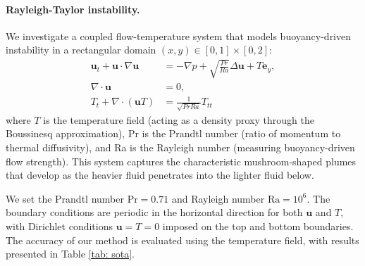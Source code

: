 \paragraph{Rayleigh-Taylor instability.} We investigate a coupled flow-temperature system that models buoyancy-driven instability in a rectangular domain $(x, y) \in [0, 1] \times [0, 2]$:
    \begin{align}
        \mathbf{u}_t + \mathbf{u} \cdot \nabla \mathbf{u}  & = - \nabla p +  \sqrt{\frac{Pr}{Ra} }\Delta \mathbf{u} + T \mathbf{e}_y,  \\
        \nabla \cdot \mathbf{u} & =0,  \\
        T_t + \nabla \cdot (\mathbf{u} T)  & =  \frac{1}{\sqrt{Pr Ra}} T_{tt} 
    \end{align}
where $T$ is the temperature field (acting as a density proxy through the Boussinesq approximation),  Pr is the Prandtl number (ratio of momentum to thermal diffusivity), and Ra is the Rayleigh number (measuring buoyancy-driven flow strength). This system captures the characteristic mushroom-shaped plumes that develop as the heavier fluid penetrates into the lighter fluid below.


We set the Prandtl number $\text{Pr}=0.71$ and Rayleigh number $\text{Ra}=10^6$. The boundary conditions are periodic in the horizontal direction for both $\mathbf{u}$ and $T$, with  Dirichlet conditions $\mathbf{u} = T = 0$ imposed on the top and bottom boundaries. The accuracy of our method is evaluated using the temperature field, with results presented in Table \ref{tab: sota}.







